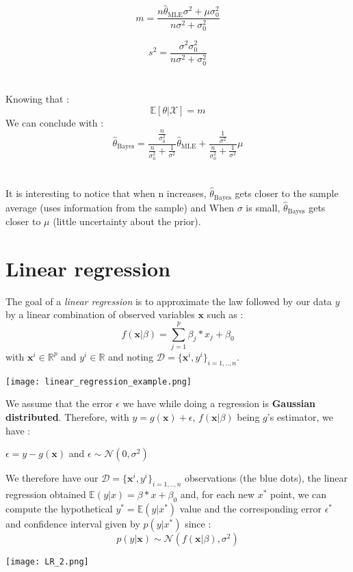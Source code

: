 \documentclass[a4paper,12pt]{article}
\newcommand{\dd}{\mathcal{D}}
\newcommand{\xx}{{\bm x}}
\begin{document}
\[m = \frac{n\hat{\theta}_{\mbox{MLE}}\sigma^2+\mu\sigma_0^2}{n\sigma^2+\sigma_0^2}
\]

\[s^2 = \frac{\sigma^2\sigma_0^2}{n\sigma^2+\sigma_0^2}
\]\\
\\
Knowing that :
\[\mathbb{E}[\theta|\mathcal{X}]=m\]
We can conclude with :
\[\hat{\theta}_{\mbox{Bayes}}=\frac{\frac{n}{\sigma_0^2}}{\frac{n}{\sigma_0^2}+\frac{1}{\sigma^2}}\hat{\theta}_{\mbox{MLE}}+\frac{\frac{1}{\sigma^2}}{\frac{n}{\sigma_0^2}+\frac{1}{\sigma^2}}\mu
\]\\
\\
It is interesting to notice that when n increases, $\hat{\theta}_{\mbox{Bayes}}$ gets closer to the sample average (uses
information from the sample) and When $\sigma$ is small, $\hat{\theta}_{\mbox{Bayes}}$ gets closer to $\mu$ (little uncertainty
about the prior).

\section{Linear regression}

The goal of a {\em linear regression} is to approximate the law followed by our data \(\textit{y}\) by a linear combination of observed variables \(\xx\) such as :
\[ f(\xx|\beta)= \displaystyle\sum_{j=1}^{p} \beta_j*x_j + \beta_0\]
with \(\xx^i \in \mathbb{R}^p\)  and \(\textit{y}^i \in \mathbb{R}\) and noting \(\dd = {\{\xx^i,\textit{y}^i\}}_{\textit{i}=1,..,\textit{n}}\).
\begin{center}
\texttt{[image: linear\_regression\_example.png]}
\end{center}

We assume that the error \(\epsilon\) we have while doing a regression is \textbf{Gaussian distributed}. Therefore, with \(y = g(\xx) + \epsilon \),  \(f(\xx|\beta)\) being \(g\)'s estimator, we have :
\begin{center}
\(\epsilon = y - g(\xx)\) and \(\epsilon\sim{}\mathcal{N}(0,{\sigma}^2)\)
\end{center}

We therefore have our \(\dd = {\{\xx^i,\textit{y}^i\}}_{\textit{i}=1,..,\textit{n}}\) observations (the blue dots), the linear regression obtained \(\mathbb{E}(y|x) = \beta*x + \beta_0\) and, for each new \(x^*\) point, we can compute the hypothetical \(y^* = \mathbb{E}(y|x^*)\) value and the corresponding error \(\epsilon^* \) and confidence interval given by \(p(y|x^*)\) since :
\[p(y|\xx)\sim{}\mathcal{N}(f(\xx|\beta),{\sigma}^2)\]
\begin{center}
\texttt{[image: LR\_2.png]}
\end{center}
\end{document}
